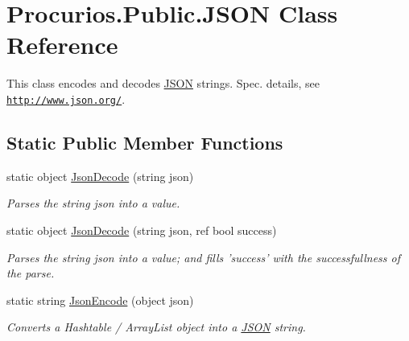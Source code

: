 \hypertarget{classProcurios_1_1Public_1_1JSON}{\section{\-Procurios.\-Public.\-J\-S\-O\-N \-Class \-Reference}
\label{classProcurios_1_1Public_1_1JSON}
}


\-This class encodes and decodes \hyperlink{classProcurios_1_1Public_1_1JSON}{\-J\-S\-O\-N} strings. \-Spec. details, see \href{http://www.json.org/}{\tt http\-://www.\-json.\-org/}.  


\subsection*{\-Static \-Public \-Member \-Functions}
\begin{DoxyCompactItemize}
\item 
static object \hyperlink{classProcurios_1_1Public_1_1JSON_a8d7ead2469ab5131a06b151bb0530f4f}{\-Json\-Decode} (string json)
\begin{DoxyCompactList}\small\item\em \-Parses the string json into a value. \end{DoxyCompactList}\item 
static object \hyperlink{classProcurios_1_1Public_1_1JSON_aeb4d67c1201712a15c017611fa966e62}{\-Json\-Decode} (string json, ref bool success)
\begin{DoxyCompactList}\small\item\em \-Parses the string json into a value; and fills 'success' with the successfullness of the parse. \end{DoxyCompactList}\item 
static string \hyperlink{classProcurios_1_1Public_1_1JSON_a34ac0737167543343a0413e29aa36f12}{\-Json\-Encode} (object json)
\begin{DoxyCompactList}\small\item\em \-Converts a \-Hashtable / \-Array\-List object into a \hyperlink{classProcurios_1_1Public_1_1JSON}{\-J\-S\-O\-N} string. \end{DoxyCompactList}\end{DoxyCompactItemize}
